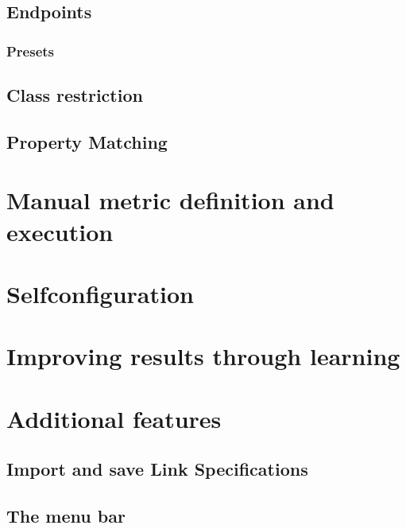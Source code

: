 \documentclass[oneside,a4paper,12pt]{memoir}
\begin{document}
	\section{Endpoints}
	\label{endpoint}
	 \subsection{Presets}
	\section{Class restriction}
	\label{classes}
	\section{Property Matching}
	\label{properties}
\chapter{Manual metric definition and execution}
\label{manual}

\chapter{Selfconfiguration}
\label{selfconfig}

\chapter{Improving results through learning}
\label{learning}

\chapter{Additional features}
\label{features}
\section{Import and save Link Specifications}
\label{ImportExport}






\appendix
\section{The menu bar}
\end{document}
